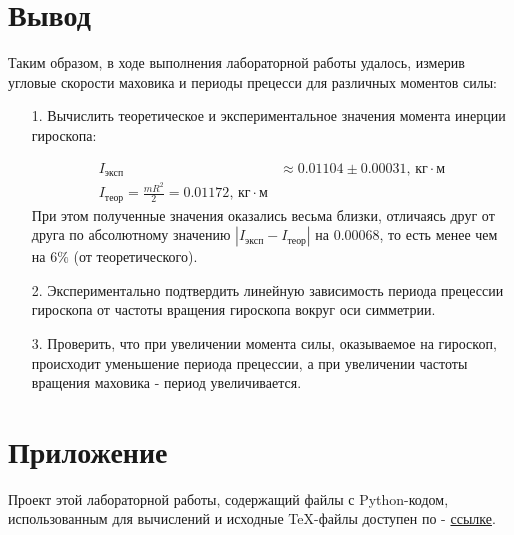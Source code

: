\documentclass[12pt, a4paper]{article}
\begin{document}
\section{Вывод}
Таким образом, в ходе выполнения лабораторной работы удалось, измерив угловые скорости маховика и периоды прецесси для различных моментов силы:
\begin{itemize}
\item[1.] Вычислить теоретическое и экспериментальное значения момента инерции гироскопа:

\begin{equation*}
\begin{aligned}
I_\text{эксп} &\approx 0.01104 \pm 0.00031 \text{, кг}\cdot\text{м} \\
I_{\text{теор}} = \frac{mR^2}{2} = 0.01172 \text{, кг}\cdot\text{м}\end{aligned}
\end{equation*}
При этом полученные значения оказались весьма близки, отличаясь друг от друга по абсолютному значению $\left| I_\text{эксп}-I_{\text{теор}}\right|$ на $0.00068$, то есть менее чем на $6\%$ (от теоретического).
 
\item[2.] Экспериментально подтвердить линейную зависимость периода прецессии гироскопа от частоты вращения гироскопа вокруг оси симметрии.

\item[3.] Проверить, что при увеличении момента силы, оказываемое на гироскоп, происходит уменьшение периода прецессии, а при увеличении частоты вращения маховика - период увеличивается.

\end{itemize}


\section{Приложение}
Проект этой лабораторной работы, содержащий файлы с Python-кодом, использованным для вычислений и исходные TeX-файлы доступен по - \href{https://github.com/Dimankarp/Studies/tree/main/LaTeX/Physics%20-%20Gyroscope}{ссылке}.
\end{document}
